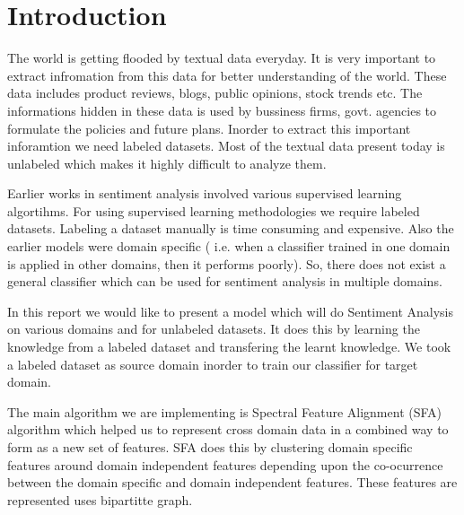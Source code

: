 \documentclass{report}
\begin{document}

\chapter{Introduction}

\par \Large The world is getting flooded by textual data everyday. It is very important to extract infromation from this data for better understanding of the world. These data includes product reviews, blogs, public opinions, stock trends etc. The informations hidden in these data is used by bussiness firms, govt. agencies to formulate the policies and future plans. Inorder to extract this important inforamtion we need labeled datasets. Most of the textual data present today is unlabeled which makes it highly difficult to analyze them. \\

\par Earlier works in sentiment analysis involved various supervised learning algortihms. For using supervised learning methodologies we require labeled datasets. Labeling a dataset manually is time consuming and expensive. Also the earlier models were domain specific ( i.e. when a classifier trained in one domain is applied in other domains, then it performs poorly). So, there does not exist a general classifier which can be used for sentiment analysis in multiple domains.  \\

\par In this report we would like to present a model which will do Sentiment Analysis on various domains and for unlabeled datasets. It does this by learning the knowledge from a labeled dataset and transfering the learnt knowledge. We took a labeled dataset as source domain inorder to train our classifier for target domain.\\

\par The main algorithm we are implementing is Spectral Feature Alignment (SFA) algorithm which helped us to represent cross domain data in a combined way to form as a new set of features. SFA does this by clustering domain specific features around domain independent features depending upon the co-ocurrence between the domain specific and domain independent features. These features are represented uses bipartitte graph.\\
\end{document}
